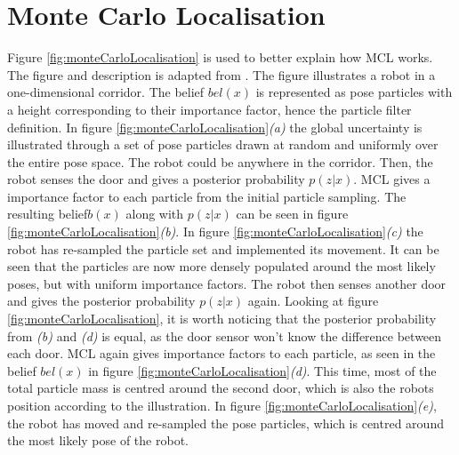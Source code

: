 \chapter{Monte Carlo Localisation} \label{A:MonteCarloLocalisation}
Figure \ref{fig:monteCarloLocalisation} is used to better explain how MCL works. The figure and description is adapted from \cite{ThrunSebastian2005Pr}. The figure illustrates a robot in a one-dimensional corridor. The belief $bel(x)$ is represented as pose particles with a height corresponding to their importance factor, hence the particle filter definition. In figure \ref{fig:monteCarloLocalisation}\textit{(a)} the global uncertainty is illustrated through a set of pose particles drawn at random and uniformly over the entire pose space. The robot could be anywhere in the corridor. Then, the robot senses the door and gives a posterior probability $p(z|x)$. MCL gives a importance factor to each particle from the initial particle sampling. The resulting belief$b(x)$ along with $p(z|x)$ can be seen in figure \ref{fig:monteCarloLocalisation}\textit{(b)}. In figure \ref{fig:monteCarloLocalisation}\textit{(c)} the robot has re-sampled the particle set and implemented its movement. It can be seen that the particles are now more densely populated around the most likely poses, but with uniform importance factors. The robot then senses another door and gives the posterior probability $p(z|x)$ again. Looking at figure \ref{fig:monteCarloLocalisation}, it is worth noticing that the posterior probability from \textit{(b)} and \textit{(d)} is equal, as the door sensor won't know the difference between each door. MCL again gives importance factors to each particle, as seen in the belief $bel(x)$ in figure \ref{fig:monteCarloLocalisation}\textit{(d)}. This time, most of the total particle mass is centred around the second door, which is also the robots position according to the illustration. In figure \ref{fig:monteCarloLocalisation}\textit{(e)}, the robot has moved and re-sampled the pose particles, which is centred around the most likely pose of the robot.

